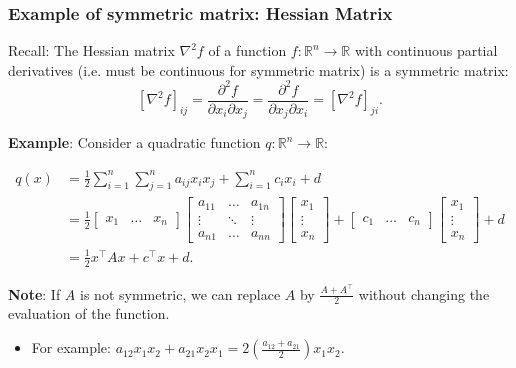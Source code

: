 \subsubsection{Example of symmetric matrix: Hessian Matrix}
\begin{example}
    Recall: The Hessian matrix \(\nabla^2 f\) of a function \( f: \mathbb{R}^n \to \mathbb{R} \) with continuous partial derivatives (i.e. must be continuous for symmetric matrix) is a symmetric matrix:
    \[
    [\nabla^2 f]_{ij} = \frac{\partial^2 f}{\partial x_i \partial x_j} = \frac{\partial^2 f}{\partial x_j \partial x_i} = [\nabla^2 f]_{ji}.
    \]

    \textbf{Example}: Consider a quadratic function \( q: \mathbb{R}^n \to \mathbb{R} \):

    \begin{align*}
        q(x) &= \frac{1}{2} \sum_{i=1}^n \sum_{j=1}^n a_{ij} x_i x_j + \sum_{i=1}^n c_i x_i + d \\
    &= \frac{1}{2} 
    \begin{bmatrix}
    x_1 & \dots & x_n
    \end{bmatrix}
    \begin{bmatrix}
    a_{11} & \dots & a_{1n} \\
    \vdots & \ddots & \vdots \\
    a_{n1} & \dots & a_{nn}
    \end{bmatrix}
    \begin{bmatrix}
    x_1 \\
    \vdots \\
    x_n
    \end{bmatrix}
    + 
    \begin{bmatrix}
    c_1 & \dots & c_n
    \end{bmatrix}
    \begin{bmatrix}
    x_1 \\
    \vdots \\
    x_n
    \end{bmatrix}
    + d \\
    &= \frac{1}{2} x^\top A x + c^\top x + d.
    \end{align*}

    \textbf{Note}: If \(A\) is not symmetric, we can replace \(A\) by \( \frac{A + A^\top}{2} \) without changing the evaluation of the function.

    \begin{itemize}
        \item For example: \(a_{12} x_1 x_2 + a_{21} x_2 x_1 = 2 \left( \frac{a_{12} + a_{21}}{2} \right) x_1 x_2\).
    \end{itemize}


\end{example}
